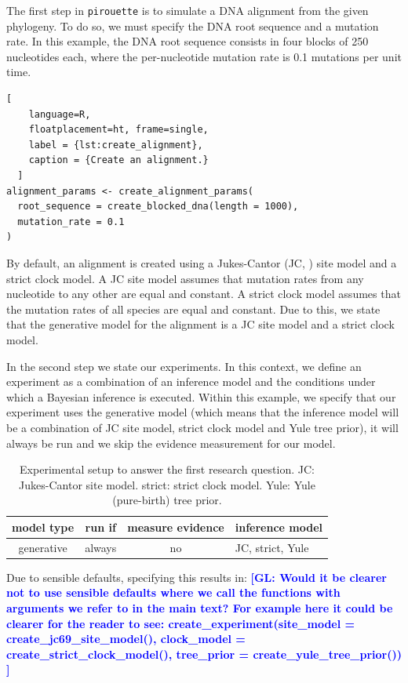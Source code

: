 \documentclass{article}
\newcommand{\giovanni}[1]{\textcolor{blue}{\textbf{[GL: #1]}}}
\begin{document}
The first step in \verb;pirouette; is to simulate a DNA alignment from the given phylogeny. 
To do so, we must specify the DNA root sequence and a mutation rate. 
In this example, the DNA root sequence consists in four blocks of 250 nucleotides each, 
where the per-nucleotide mutation rate is 0.1 mutations per unit time.

\begin{lstlisting}[
    language=R,
    floatplacement=ht, frame=single,
    label = {lst:create_alignment}, 
    caption = {Create an alignment.}
  ]
alignment_params <- create_alignment_params(
  root_sequence = create_blocked_dna(length = 1000),
  mutation_rate = 0.1
)
\end{lstlisting}

By default, an alignment is created using a Jukes-Cantor (JC, \cite{jukes1969evolution}) site model
and a strict clock model. 
A JC site model assumes that mutation rates from any nucleotide to any other 
are equal and constant. 
A strict clock model assumes that the mutation rates of all species are equal and constant.
Due to this, we state that the generative model for the alignment is
a JC site model and a strict clock model.

In the second step we state our experiments. In this context, we
define an experiment as a combination of an inference model
and the conditions under which a Bayesian inference is executed.
Within this example, we specify that our experiment uses the
generative model (which means that the inference model will be 
a combination of JC site model, strict clock model and Yule tree prior), 
it will always be run and we skip the evidence measurement for our model.

\begin{table}
  \begin{tabular}{ | c | c | c | l | }
    \hline
    \textbf{model type} & \textbf{run if} & \textbf{measure evidence} & \textbf{inference model} \\ 
    \hline
    generative & always & no & JC, strict, Yule \\
    \hline
  \end{tabular}
  \caption{
    Experimental setup to answer the first research question.
    JC: Jukes-Cantor site model.
    strict: strict clock model.
    Yule: Yule (pure-birth) tree prior.
  }
  \label{tbl:RQ1}
\end{table}

Due to sensible defaults, specifying this
results in:
\giovanni{Would it be clearer not to use sensible defaults where we call the functions with arguments we refer to in the main text? For example here it could be clearer for the reader to see:
create\_experiment(site\_model = create\_jc69\_site\_model(), clock\_model = create\_strict\_clock\_model(), tree\_prior = create\_yule\_tree\_prior())
}
\end{document}
